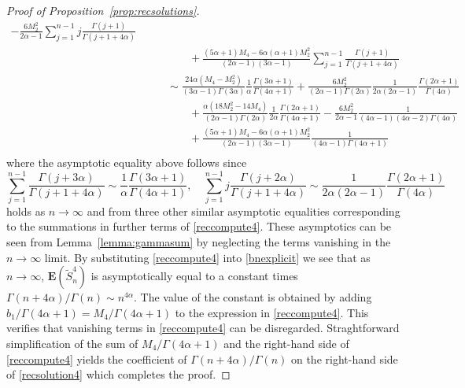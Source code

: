 \documentclass[12pt,a4paper]{article}
\newcommand{\E}{\mathbf E}
\newcommand{\wt}{\widetilde}
\numberwithin{equation}{section}
\begin{document}
\begin{proof}[Proof of Proposition~\ref{prop:recsolutions}]
\begin{equation}
\begin{aligned}
-\frac{6M_2^2}{2\alpha-1}\sum_{j=1}^{n-1}j\frac{\Gamma(j+1)}{\Gamma(j+1+4\alpha)}\\
&\qquad\qquad+\frac{(5\alpha+1)M_4-6\alpha(\alpha+1)M_2^2}{(2\alpha-1)(3\alpha-1)}\sum_{j=1}^{n-1}\frac{\Gamma(j+1)}{\Gamma(j+1+4\alpha)}\\
&\qquad\sim\frac{24\alpha(M_4-M_2^2)}{(3\alpha-1)\Gamma(3\alpha)}\frac1\alpha\frac{\Gamma(3\alpha+1)}{\Gamma(4\alpha+1)}
+\frac{6M_2^2}{(2\alpha-1)\Gamma(2\alpha)}\frac1{2\alpha(2\alpha-1)}\frac{\Gamma(2\alpha+1)}{\Gamma(4\alpha)}\\
&\qquad\qquad+\frac{\alpha(18M_2^2-14M_4)}{(2\alpha-1)\Gamma(2\alpha)}\frac1{2\alpha}\frac{\Gamma(2\alpha+1)}{\Gamma(4\alpha+1)}
-\frac{6M_2^2}{2\alpha-1}\frac1{(4\alpha-1)(4\alpha-2)\Gamma(4\alpha)}\\
&\qquad\qquad+\frac{(5\alpha+1)M_4-6\alpha(\alpha+1)M_2^2}{(2\alpha-1)(3\alpha-1)}\frac1{(4\alpha-1)\Gamma(4\alpha+1)}\\
\end{aligned}\end{equation}
where the asymptotic equality above follows since
\begin{equation}\label{sumasympt}
\sum_{j=1}^{n-1}\frac{\Gamma(j+3\alpha)}{\Gamma(j+1+4\alpha)}\sim\frac1\alpha\frac{\Gamma(3\alpha+1)}{\Gamma(4\alpha+1)},\quad
\sum_{j=1}^{n-1}j\frac{\Gamma(j+2\alpha)}{\Gamma(j+1+4\alpha)}\sim\frac1{2\alpha(2\alpha-1)}\frac{\Gamma(2\alpha+1)}{\Gamma(4\alpha)}
\end{equation}
holds as $n\to\infty$ and from three other similar asymptotic equalities corresponding to the summations in further terms of \eqref{reccompute4}.
These asymptotics can be seen from Lemma~\ref{lemma:gammasum} by neglecting the terms vanishing in the $n\to\infty$ limit.
By substituting \eqref{reccompute4} into \eqref{bnexplicit} we see that as $n\to\infty$,
$\E(\wt S_n^4)$ is asymptotically equal to a constant times $\Gamma(n+4\alpha)/\Gamma(n)\sim n^{4\alpha}$.
The value of the constant is obtained by adding $b_1/\Gamma(4\alpha+1)=M_4/\Gamma(4\alpha+1)$ to the expression in \eqref{reccompute4}.
This verifies that vanishing terms in \eqref{reccompute4} can be disregarded.
Straghtforward simplification of the sum of $M_4/\Gamma(4\alpha+1)$ and the right-hand side of \eqref{reccompute4} yields the coefficient of $\Gamma(n+4\alpha)/\Gamma(n)$
on the right-hand side of \eqref{recsolution4} which completes the proof.
\end{proof}
\end{document}

